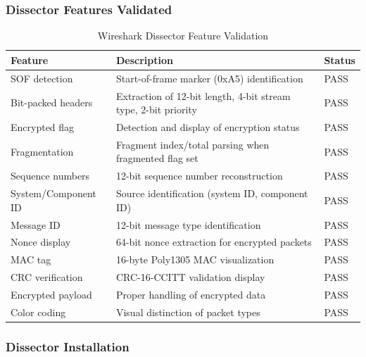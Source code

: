 \documentclass[11pt,a4paper]{article}
\begin{document}
\subsubsection{Dissector Features Validated}

\begin{table}[H]
	\centering
	\begin{tabular}{@{}lp{8cm}l@{}}
		\toprule
		\textbf{Feature} & \textbf{Description} & \textbf{Status} \\
		\midrule
		SOF detection       & Start-of-frame marker (0xA5) identification & \textcolor{codegreen}{PASS} \\
		Bit-packed headers  & Extraction of 12-bit length, 4-bit stream type, 2-bit priority & \textcolor{codegreen}{PASS} \\
		Encrypted flag      & Detection and display of encryption status & \textcolor{codegreen}{PASS} \\
		Fragmentation       & Fragment index/total parsing when fragmented flag set & \textcolor{codegreen}{PASS} \\
		Sequence numbers    & 12-bit sequence number reconstruction & \textcolor{codegreen}{PASS} \\
		System/Component ID & Source identification (system ID, component ID) & \textcolor{codegreen}{PASS} \\
		Message ID          & 12-bit message type identification & \textcolor{codegreen}{PASS} \\
		Nonce display       & 64-bit nonce extraction for encrypted packets & \textcolor{codegreen}{PASS} \\
		MAC tag             & 16-byte Poly1305 MAC visualization & \textcolor{codegreen}{PASS} \\
		CRC verification    & CRC-16-CCITT validation display & \textcolor{codegreen}{PASS} \\
		Encrypted payload   & Proper handling of encrypted data & \textcolor{codegreen}{PASS} \\
		Color coding        & Visual distinction of packet types & \textcolor{codegreen}{PASS} \\
		\bottomrule
	\end{tabular}
	\caption{Wireshark Dissector Feature Validation}
\end{table}

\subsubsection{Dissector Installation}
\end{document}

